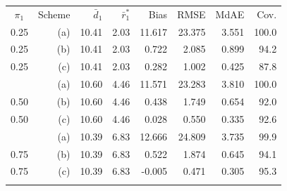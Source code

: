 \begin{tabular}{crrrrrrr}
\toprule
$\pi_1$ & Scheme & $\bar d_1$ & $\bar r_1^*$ & Bias & RMSE & MdAE & Cov. \\
0.25 & (a) & 10.41 & 2.03 & 11.617 & 23.375 & 3.551 & 100.0 \\
0.25 & (b) & 10.41 & 2.03 & 0.722 & 2.085 & 0.899 & 94.2 \\
0.25 & (c) & 10.41 & 2.03 & 0.282 & 1.002 & 0.425 & 87.8 \\
\addlinespace
0.50 & (a) & 10.60 & 4.46 & 11.571 & 23.283 & 3.810 & 100.0 \\
0.50 & (b) & 10.60 & 4.46 & 0.438 & 1.749 & 0.654 & 92.0 \\
0.50 & (c) & 10.60 & 4.46 & 0.028 & 0.550 & 0.335 & 92.6 \\
\addlinespace
0.75 & (a) & 10.39 & 6.83 & 12.666 & 24.809 & 3.735 & 99.9 \\
0.75 & (b) & 10.39 & 6.83 & 0.522 & 1.874 & 0.645 & 94.1 \\
0.75 & (c) & 10.39 & 6.83 & -0.005 & 0.471 & 0.305 & 95.3 \\
\addlinespace
\bottomrule
\end{tabular}

